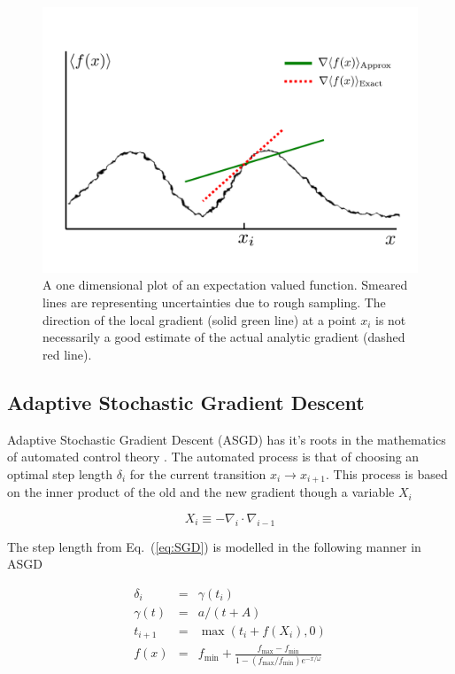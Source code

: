 \begin{figure}
 \begin{center}
  \includegraphics[scale=0.3]{../Graphics/SSGD.pdf}
  \caption{A one dimensional plot of an expectation valued function. Smeared lines are representing uncertainties due to rough sampling. The direction of the local gradient (solid green line) at a point $x_i$ is not necessarily a good estimate of the actual analytic gradient (dashed red line).}
  \label{fig:sSGD}
 \end{center}
\end{figure}


\subsection{Adaptive Stochastic Gradient Descent}

Adaptive Stochastic Gradient Descent (ASGD) has it's roots in the mathematics of automated control theory \cite{ASGD_MB}. The automated process is that of choosing an optimal step length $\delta_i$ for the current transition $x_{i}\to x_{i+1}$. This process is based on the inner product of the old and the new gradient though a variable $X_i$

\begin{equation}
\label{eq:ASGD_X_i}
 X_i \equiv -\nabla_i\cdot \nabla_{i-1}
\end{equation}

The step length from Eq.~(\ref{eq:SGD}) is modelled in the following manner in ASGD

\begin{eqnarray}
 \delta_i   &=& \gamma(t_i) \\
 \gamma(t)  &=& a/(t + A) \label{eq:ASGD_delta_i}\\
 t_{i+1}    &=& \max(t_i + f(X_i), 0) \label{eq:ASGD_t_i}\\
 f(x)       &=& f_\mathrm{min} + \frac{f_\mathrm{max} - f_\mathrm{min}}{1 - (f_\mathrm{max}/f_\mathrm{min})e^{-x/\omega}}\label{eq:ASGD_f_i}
\end{eqnarray}

